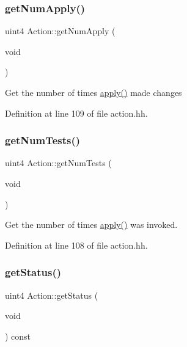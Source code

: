 \subsubsection{\texorpdfstring{getNumApply()}{getNumApply()}}
{\footnotesize\ttfamily uint4 Action\+::get\+Num\+Apply (\begin{DoxyParamCaption}\item[{void}]{ }\end{DoxyParamCaption})\hspace{0.3cm}{\ttfamily [inline]}}

Get the number of times \mbox{\hyperlink{class_action_aac1c3999d6c685b15f5d9765a4d04173}{apply()}} made changes 

Definition at line 109 of file action.\+hh.

\mbox{\label{class_action_adb54fc152a449d8f4879ed3817e60510}} 
\subsubsection{\texorpdfstring{getNumTests()}{getNumTests()}}
{\footnotesize\ttfamily uint4 Action\+::get\+Num\+Tests (\begin{DoxyParamCaption}\item[{void}]{ }\end{DoxyParamCaption})\hspace{0.3cm}{\ttfamily [inline]}}



Get the number of times \mbox{\hyperlink{class_action_aac1c3999d6c685b15f5d9765a4d04173}{apply()}} was invoked. 



Definition at line 108 of file action.\+hh.

\mbox{\label{class_action_a8feb7d10db168e8e92a39d6df995f375}} 
\subsubsection{\texorpdfstring{getStatus()}{getStatus()}}
{\footnotesize\ttfamily uint4 Action\+::get\+Status (\begin{DoxyParamCaption}\item[{void}]{ }\end{DoxyParamCaption}) const\hspace{0.3cm}{\ttfamily [inline]}}



